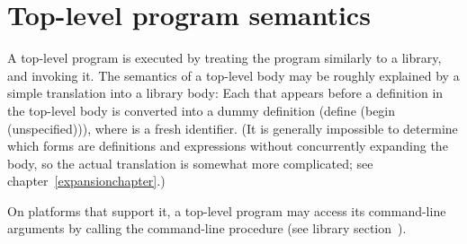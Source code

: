 \section{Top-level program semantics}

A top-level program is executed by treating the program similarly to a library, and
invoking it.  The semantics of a top-level body may be roughly explained by
a simple translation into a library body: 
Each  that appears before a
definition in
the top-level body is converted into a dummy definition 
{\cf (define  (begin  (unspecified)))},
where  is a fresh identifier.
(It is generally impossible to determine which forms are 
definitions and expressions without concurrently expanding the body, so
the actual translation is somewhat more complicated; see
chapter~\ref{expansionchapter}.)

On platforms that support it, a top-level program may access its command-line 
arguments by calling the {\cf command-line} procedure (see library 
section~).

